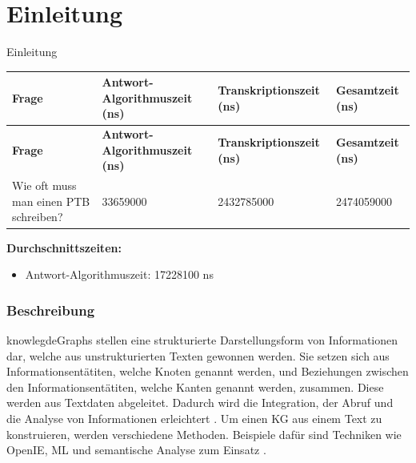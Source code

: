 \section{Einleitung}
Einleitung


\begin{longtable}{|p{5cm}|p{3cm}|p{3.5cm}|p{3cm}|}
\hline
\textbf{Frage} & \textbf{Antwort-Algorithmuszeit (ns)} & \textbf{Transkriptionszeit (ns)} & \textbf{Gesamtzeit (ns)} \\
\hline
\endfirsthead

\hline
\textbf{Frage} & \textbf{Antwort-Algorithmuszeit (ns)} & \textbf{Transkriptionszeit (ns)} & \textbf{Gesamtzeit (ns)} \\
\hline
\endhead

\hline
\endfoot

Wie oft muss man einen PTB schreiben? & 33659000 & 2432785000 & 2474059000 \\
\hline

\end{longtable}

\textbf{Durchschnittszeiten:}
\begin{itemize}
    \item Antwort-Algorithmuszeit: 17228100 ns
\end{itemize}

\subsubsection{Beschreibung}
\ac{knowlegdeGraphs} stellen eine strukturierte Darstellungsform von Informationen dar, welche aus unstrukturierten Texten gewonnen werden. Sie setzen sich aus Informationsentätiten, welche Knoten genannt werden, und Beziehungen zwischen den Informationsentätiten, welche Kanten genannt werden, zusammen. Diese werden aus Textdaten abgeleitet. Dadurch wird die Integration, der Abruf und die Analyse von Informationen erleichtert \cite{Hojas-Mazo2018A}. Um einen KG aus einem Text zu konstruieren, werden verschiedene Methoden. Beispiele dafür sind Techniken wie \ac{OpenIE}, \ac{ML} und semantische Analyse zum Einsatz \cite{OpenIEbased}.

